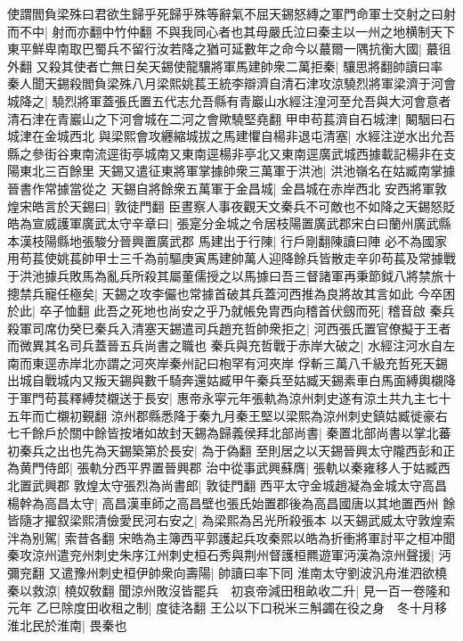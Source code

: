 使謂閻負梁殊曰君欲生歸乎死歸乎殊等辭氣不屈天錫怒縳之軍門命軍士交射之曰射而不中|{
	射而亦翻中竹仲翻}
不與我同心者也其母嚴氏泣曰秦主以一州之地横制天下東平鮮卑南取巴蜀兵不留行汝若降之猶可延數年之命今以蕞爾一隅抗衡大國|{
	蕞徂外翻}
又殺其使者亡無日矣天錫使龍驤將軍馬建帥衆二萬拒秦|{
	驤思將翻帥讀曰率}
秦人聞天錫殺閻負梁殊八月梁熙姚萇王統李辯濟自清石津攻涼驍烈將軍梁濟于河會城降之|{
	驍烈將軍蓋張氏置五代志允吾縣有青巖山水經注湟河至允吾與大河會意者清石津在青巖山之下河會城在二河之會歟驍堅堯翻}
甲申苟萇濟自石城津|{
	闞駰曰石城津在金城西北}
與梁熙會攻纒縮城拔之馬建懼自楊非退屯清塞|{
	水經注逆水出允吾縣之參街谷東南流逕街亭城南又東南逕楊非亭北又東南逕廣武城西據載記楊非在支陽東北三百餘里}
天錫又遣征東將軍掌據帥衆三萬軍于洪池|{
	洪池嶺名在姑臧南掌據晉書作常據當從之}
天錫自將餘衆五萬軍于金昌城|{
	金昌城在赤岸西北}
安西將軍敦煌宋皓言於天錫曰|{
	敦徒門翻}
臣晝察人事夜觀天文秦兵不可敵也不如降之天錫怒貶皓為宣威護軍廣武太守辛章曰|{
	張寔分金城之令居枝陽置廣武郡宋白曰蘭州廣武縣本漢枝陽縣地張駿分晉興置廣武郡}
馬建出于行陳|{
	行戶剛翻陳讀曰陣}
必不為國家用苟萇使姚萇帥甲士三千為前驅庚寅馬建帥萬人迎降餘兵皆散走辛卯苟萇及常據戰于洪池據兵敗馬為亂兵所殺其屬董儒授之以馬據曰吾三督諸軍再秉節鉞八將禁旅十摠禁兵寵任極矣|{
	天錫之攻李儼也常據首破其兵蓋河西推為良將故其言如此}
今卒困於此|{
	卒子恤翻}
此吾之死地也尚安之乎乃就帳免胄西向稽首伏劔而死|{
	稽音啟}
秦兵殺軍司席仂癸巳秦兵入清塞天錫遣司兵趙充哲帥衆拒之|{
	河西張氏置官僚擬于王者而微異其名司兵蓋晉五兵尚書之職也}
秦兵與充哲戰于赤岸大破之|{
	水經注河水自左南而東逕赤岸北亦謂之河夾岸秦州記曰枹罕有河夾岸}
俘斬三萬八千級充哲死天錫出城自戰城内又叛天錫與數千騎奔還姑臧甲午秦兵至姑臧天錫素車白馬面縛輿櫬降于軍門苟萇釋縛焚櫬送于長安|{
	惠帝永寜元年張軌為涼州刺史遂有涼土共九主七十五年而亡櫬初覲翻}
涼州郡縣悉降于秦九月秦王堅以梁熙為涼州刺史鎮姑臧徙豪右七千餘戶於關中餘皆按堵如故封天錫為歸義侯拜北部尚書|{
	秦置北部尚書以掌北蕃}
初秦兵之出也先為天錫築第於長安|{
	為于偽翻}
至則居之以天錫晉興太守隴西彭和正為黄門侍郎|{
	張軌分西平界置晉興郡}
治中從事武興蘇膺|{
	張軌以秦雍移人于姑臧西北置武興郡}
敦煌太守張烈為尚書郎|{
	敦徒門翻}
西平太守金城趙凝為金城太守高昌楊幹為高昌太守|{
	高昌漢車師之高昌壁也張氏始置郡後為高昌國唐以其地置西州}
餘皆隨才擢叙梁熙清儉愛民河右安之|{
	為梁熙為呂光所殺張本}
以天錫武威太守敦煌索泮為别駕|{
	索昔各翻}
宋皓為主簿西平郭護起兵攻秦熙以皓為折衝將軍討平之桓冲聞秦攻涼州遣兖州刺史朱序江州刺史桓石秀與荆州督護桓羆遊軍沔漢為涼州聲援|{
	沔彌兖翻}
又遣豫州刺史桓伊帥衆向壽陽|{
	帥讀曰率下同}
淮南太守劉波汎舟淮泗欲橈秦以救涼|{
	橈奴敎翻}
聞涼州敗沒皆罷兵　初哀帝減田租畝收二升|{
	見一百一卷隆和元年}
乙巳除度田收租之制|{
	度徒洛翻}
王公以下口税米三斛蠲在役之身　冬十月移淮北民於淮南|{
	畏秦也}
